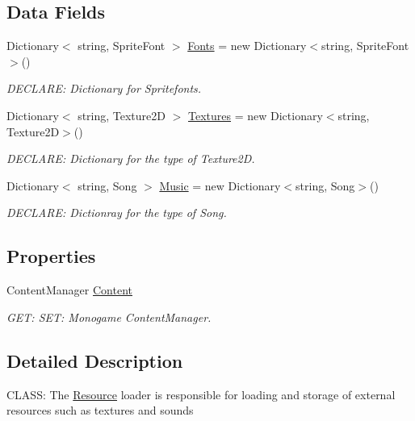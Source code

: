 \subsection*{Data Fields}
\begin{DoxyCompactItemize}
\item 
Dictionary$<$ string, Sprite\+Font $>$ \hyperlink{a00530_a00c311d64cae0ba6d592ea37dafffdc8}{Fonts} = new Dictionary$<$string, Sprite\+Font$>$()
\begin{DoxyCompactList}\small\item\em D\+E\+C\+L\+A\+RE\+: Dictionary for Spritefonts. \end{DoxyCompactList}\item 
Dictionary$<$ string, Texture2D $>$ \hyperlink{a00530_a0a1c5385822e9334a2747b4dac701ec9}{Textures} = new Dictionary$<$string, Texture2D$>$()
\begin{DoxyCompactList}\small\item\em D\+E\+C\+L\+A\+RE\+: Dictionary for the type of Texture2D. \end{DoxyCompactList}\item 
Dictionary$<$ string, Song $>$ \hyperlink{a00530_a2b471bcf803817288914773957bc3e4e}{Music} = new Dictionary$<$string, Song$>$()
\begin{DoxyCompactList}\small\item\em D\+E\+C\+L\+A\+RE\+: Dictionray for the type of Song. \end{DoxyCompactList}\end{DoxyCompactItemize}
\subsection*{Properties}
\begin{DoxyCompactItemize}
\item 
Content\+Manager \hyperlink{a00530_a4d635d8ea6e09eb1e403da947ac92bc2}{Content}
\begin{DoxyCompactList}\small\item\em G\+ET\+: S\+ET\+: Monogame Content\+Manager. \end{DoxyCompactList}\end{DoxyCompactItemize}


\subsection{Detailed Description}
C\+L\+A\+SS\+: The \hyperlink{a00272}{Resource} loader is responsible for loading and storage of external resources such as textures and sounds 



